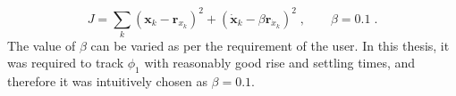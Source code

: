 \begin{equation}
J = \sum_k (\mathbf{x}_k - \mathbf{r}_{x_k})^2 +(\mathbf{\Dot{x}}_k - \beta\mathbf{r}_{\Dot{x}_k})^2 \;, \quad \quad \beta = 0.1 \;.
\end{equation}
The value of $\beta$ can be varied as per the requirement of the user. In this thesis, it was required to track $\phi_1$ with reasonably good rise and settling times, and therefore it was intuitively chosen as $\beta = 0.1$.
\newpage
